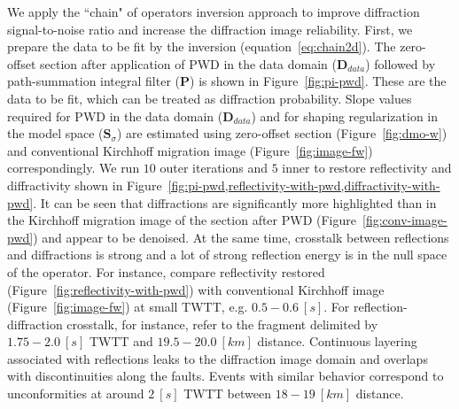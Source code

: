 We apply the ``chain" of operators inversion approach to improve diffraction signal-to-noise ratio
and increase the diffraction image reliability.
First, we prepare the data to be fit by the inversion (equation~\ref{eq:chain2d}). The zero-offset section after application
of 
PWD in the data domain ($\mathbf{D}_{data}$) followed by path-summation integral filter ($\mathbf{P}$)
is shown in Figure~\ref{fig:pi-pwd}. These are the data to be fit, which
can be treated as diffraction probability. Slope values required for PWD in the data domain ($\mathbf{D}_{data}$)
and for shaping regularization in the model space ($\mathbf{S}_{\sigma}$) are estimated using zero-offset section (Figure~\ref{fig:dmo-w}) and conventional Kirchhoff
migration image (Figure~\ref{fig:image-fw}) correspondingly. We run $10$ outer iterations and $5$ inner to restore reflectivity
and diffractivity shown in Figure~\ref{fig:pi-pwd,reflectivity-with-pwd,diffractivity-with-pwd}. It can be seen that
diffractions are significantly more highlighted than in the Kirchhoff migration image of the section after PWD (Figure~\ref{fig:conv-image-pwd}) and appear to be denoised.
At the same time, crosstalk between reflections and diffractions is strong and a lot of strong reflection energy is in the null space of the operator. For instance,
compare reflectivity restored (Figure~\ref{fig:reflectivity-with-pwd}) with conventional Kirchhoff image (Figure~\ref{fig:image-fw}) at small TWTT, e.g. $0.5-0.6\ [s]$.
For reflection-diffraction crosstalk, for instance, refer to the fragment delimited by $1.75-2.0\ [s]$ TWTT and $19.5-20.0\ [km]$ distance. Continuous layering
associated with reflections leaks to the diffraction image domain and overlaps with discontinuities along the faults. Events with similar 
behavior correspond to
unconformities at around $2\ [s]$ TWTT between $18-19\ [km]$ distance.


